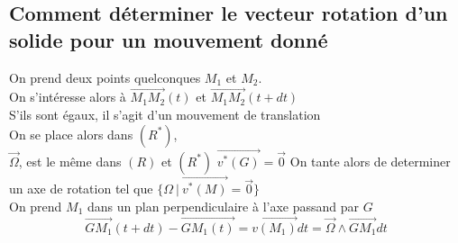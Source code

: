 \documentclass[../main.tex]{subfile}
\begin{document}
\subsection{Comment déterminer le vecteur rotation d'un solide pour un mouvement donné}
On prend deux points quelconques $M_1$ et $M_2$.\\
On s'intéresse alors à $\vec{M_1M_2}(t)$ et $\vec{M_1M_2}(t + dt)$\\
S'ils sont égaux, il s'agit d'un mouvement de translation\\






On se place alors dans $(R^*)$, \\
$\vec{\Omega}$, est le même dans $(R)$ et $(R^*)$
$\vec{v^*(G)} = \vec{0}$
On tante alors de determiner un axe de rotation tel que $\{\Omega \ | \ \vec{v^*(M)} = \vec{0}\}$\\
On prend $M_1$ dans un plan perpendiculaire à l'axe passand par $G$\\
$$\vec{GM_1}(t + dt) - \vec{GM_1(t)} = \vec{v(M_1)}dt = \vec{\Omega} \wedge \vec{GM_1} dt$$
\end{document}
